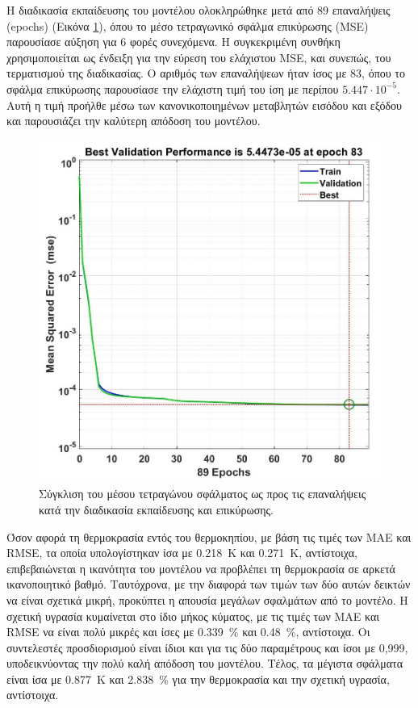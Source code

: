 \documentclass[12pt, a4paper]{report} %
\newcommand{\english}{\foreignlanguage{english}}
\begin{document}
Η διαδικασία εκπαίδευσης του μοντέλου ολοκληρώθηκε μετά από 89 επαναλήψεις (\english{epochs}) (Εικόνα \ref{fig_NN_MSE}), 
όπου το μέσο τετραγωνικό σφάλμα επικύρωσης (\english{MSE}) παρουσίασε αύξηση για 6 φορές συνεχόμενα. Η συγκεκριμένη 
συνθήκη χρησιμοποιείται ως ένδειξη για την εύρεση του ελάχιστου \english{MSE}, και συνεπώς, του τερματισμού της 
διαδικασίας. Ο αριθμός των επαναλήψεων ήταν ίσος με 83, όπου το σφάλμα επικύρωσης παρουσίασε την ελάχιστη τιμή του ίση 
με περίπου $5.447 \cdot 10^{-5}$. Αυτή η τιμή προήλθε μέσω των κανονικοποιημένων μεταβλητών εισόδου και εξόδου και 
παρουσιάζει την καλύτερη απόδοση του μοντέλου.

\begin{figure}[ht]%
    \centering
    \includegraphics[scale=0.45]{Figures/NN_MSE.jpg}
    \caption{Σύγκλιση του μέσου τετραγώνου σφάλματος ως προς τις επαναλήψεις κατά την διαδικασία εκπαίδευσης και 
    επικύρωσης.}
    \label{fig_NN_MSE}
\end{figure}

Όσον αφορά τη θερμοκρασία εντός του θερμοκηπίου, με βάση τις τιμές των \english{MAE} και \english{RMSE}, τα οποία 
υπολογίστηκαν ίσα με \SI{0,218}{\kelvin} και \SI{0,271}{\kelvin}, αντίστοιχα, επιβεβαιώνεται η ικανότητα του μοντέλου 
να προβλέπει τη θερμοκρασία σε αρκετά ικανοποιητικό βαθμό. Ταυτόχρονα, με την διαφορά των τιμών των δύο αυτών δεικτών 
να είναι σχετικά μικρή, προκύπτει η απουσία μεγάλων σφαλμάτων από το μοντέλο. Η σχετική υγρασία κυμαίνεται στο ίδιο 
μήκος κύματος, με τις τιμές των \english{MAE} και \english{RMSE} να είναι πολύ μικρές και ίσες με \SI{0,339}{\percent} 
και \SI{0,48}{\percent}, αντίστοιχα. Οι συντελεστές προσδιορισμού είναι ίδιοι και για τις δύο παραμέτρους και ίσοι με 
0,999, υποδεικνύοντας την πολύ καλή απόδοση του μοντέλου. Τέλος, τα μέγιστα σφάλματα είναι ίσα με \SI{0,877}{\kelvin} 
και \SI{2,838}{\percent} για την θερμοκρασία και την σχετική υγρασία, αντίστοιχα.
\end{document}
